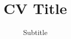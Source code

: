 \documentclass{curve}
\title{CV Title}
\subtitle{Subtitle}
\begin{document}
\makeheaders[t]
\maketitle

\nocite{*}


\end{document}
